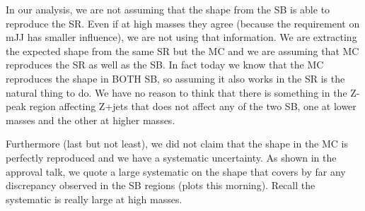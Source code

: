In our analysis, we are not assuming that the shape from the SB is able to
reproduce the SR. Even if at high masses they agree (because the requirement on
mJJ has smaller influence), we are not using that information.
We are extracting the expected shape from the same SR but the MC and we are
assuming that MC reproduces the SR as well as the SB. In fact today we know that
the MC reproduces the shape in BOTH SB, so assuming it also works in the SR is
the natural thing to do. We have no reason to think that there is something in
the Z-peak region affecting Z+jets that does not affect any of the two SB, one
at lower masses and the other at higher masses.

Furthermore (last but not least), we did not claim that the shape in the MC is
perfectly reproduced and we have a systematic uncertainty. As shown in the
approval talk, we quote a large systematic on the shape that covers by far any
discrepancy observed in the SB regions (plots this morning).
Recall the systematic is really large at high masses.

